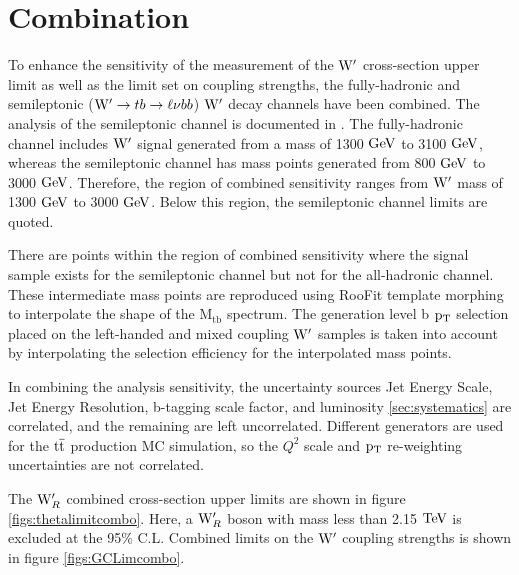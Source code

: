 \chapter{Combination}
\label{sec:combo}
To enhance the sensitivity of the measurement of the $\mathrm{W}^\prime$ cross-section upper limit as well as the limit set on coupling strengths, the fully-hadronic and 
semileptonic ($\mathrm{W}^\prime \to tb \to \ell\nu bb$) $\mathrm{W}^\prime$ decay channels have been combined.  
The analysis of the semileptonic channel is documented in \cite{Chatrchyan:2014koa}.  The fully-hadronic channel includes $\mathrm{W}^\prime$ signal generated from a 
mass of 1300 $\mathrm{GeV}$ to 3100 $\mathrm{GeV}$, whereas the semileptonic channel has mass points generated from 800 $\mathrm{GeV}$ to 3000 $\mathrm{GeV}$.  Therefore, the region of 
combined sensitivity ranges from $\mathrm{W}^\prime$ mass of 1300 $\mathrm{GeV}$ to 3000 $\mathrm{GeV}$.  Below this region, the semileptonic channel limits are quoted.  

There are points within the region of combined sensitivity where the signal sample exists for the semileptonic channel but not for the all-hadronic channel.  These 
intermediate mass points are reproduced using RooFit template morphing to interpolate the shape of the $\mathrm{M_{tb}}$ spectrum.  
The generation level b $\mathrm{p_{T}}$ selection placed on the left-handed and mixed coupling $\mathrm{W}^\prime$ samples is taken into account by interpolating the 
selection efficiency for the interpolated mass points.

In combining the analysis sensitivity, the uncertainty sources Jet Energy Scale, 
Jet Energy Resolution, b-tagging scale factor, and luminosity \ref{sec:systematics} are correlated, and the remaining are left uncorrelated.  
Different generators are used for the $\mathrm{t\overline{t}}$ production MC simulation, so the $Q^2$ scale and $\mathrm{p_{T}}$ re-weighting uncertainties are not correlated.

The $\mathrm{W}^\prime_{R}$ combined cross-section upper limits are shown in figure \ref{figs:thetalimitcombo}.  Here, a $\mathrm{W}^\prime_{R}$ boson with mass less than 2.15 $\mathrm{TeV}$ is excluded at the 95\% C.L.  
Combined limits on the $\mathrm{W}^\prime$ coupling strengths is shown in figure \ref{figs:GCLimcombo}.

